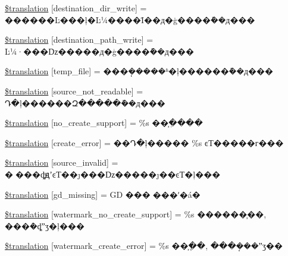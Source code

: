\begin{DoxyCompactItemize}
\hyperlink{class_8upload_8zh___c_n_8gb-2312_8php_a97608ea194a616db49141a0e6dee900c}{\$translation} \mbox{[}\textquotesingle{}destination\+\_\+dir\+\_\+write\textquotesingle{}\mbox{]} = \textquotesingle{}������Ŀ���ļ�Ŀ¼����Ϊ��д�ģ����ܽ��д���\textquotesingle{}
\item 
\hyperlink{class_8upload_8zh___c_n_8gb-2312_8php_a40e4e1962226b89fd76da5819a9602b0}{\$translation} \mbox{[}\textquotesingle{}destination\+\_\+path\+\_\+write\textquotesingle{}\mbox{]} = \textquotesingle{}Ŀ¼·���ǲ�����д�ģ����ܽ��д���\textquotesingle{}
\item 
\hyperlink{class_8upload_8zh___c_n_8gb-2312_8php_a2baece8da11e20d45175db91851ec3e3}{\$translation} \mbox{[}\textquotesingle{}temp\+\_\+file\textquotesingle{}\mbox{]} = \textquotesingle{}���ܴ�����ʱ�ļ������ܽ��д���\textquotesingle{}
\item 
\hyperlink{class_8upload_8zh___c_n_8gb-2312_8php_a922967ca2df0efdd455261142d8e5715}{\$translation} \mbox{[}\textquotesingle{}source\+\_\+not\+\_\+readable\textquotesingle{}\mbox{]} = \textquotesingle{}Դ�ļ������Զ�����ܽ��д���\textquotesingle{}
\item 
\hyperlink{class_8upload_8zh___c_n_8gb-2312_8php_a346dfd1ade29f583dd20d345c436859f}{\$translation} \mbox{[}\textquotesingle{}no\+\_\+create\+\_\+support\textquotesingle{}\mbox{]} = \textquotesingle{}\%s ��֧�ִ���\textquotesingle{}
\item 
\hyperlink{class_8upload_8zh___c_n_8gb-2312_8php_a53013ce9255c4e1849098ddd9fdb2b3f}{\$translation} \mbox{[}\textquotesingle{}create\+\_\+error\textquotesingle{}\mbox{]} = \textquotesingle{}��Դ�ļ����� \%s ͼƬ�����г���\textquotesingle{}
\item 
\hyperlink{class_8upload_8zh___c_n_8gb-2312_8php_a6ab0a660b457eaf2d3434b225449fdd6}{\$translation} \mbox{[}\textquotesingle{}source\+\_\+invalid\textquotesingle{}\mbox{]} = \textquotesingle{}�޷���ȡԭʼͼƬ��ȷ���ǲ�����ȷ��ͼƬ�ļ���\textquotesingle{}
\item 
\hyperlink{class_8upload_8zh___c_n_8gb-2312_8php_a7f3dfcc0db4bbc0f2e7210c439798e56}{\$translation} \mbox{[}\textquotesingle{}gd\+\_\+missing\textquotesingle{}\mbox{]} = \textquotesingle{}G\+D ���񲻿���ʹ�á�\textquotesingle{}
\item 
\hyperlink{class_8upload_8zh___c_n_8gb-2312_8php_a82d5853430ab72dc1f9799ec36144cc6}{\$translation} \mbox{[}\textquotesingle{}watermark\+\_\+no\+\_\+create\+\_\+support\textquotesingle{}\mbox{]} = \textquotesingle{}\%s ������֧��, ���ܶ�ȡˮӡ�ļ���\textquotesingle{}
\item 
\hyperlink{class_8upload_8zh___c_n_8gb-2312_8php_aabca0b65dadbc6184415c16375f284ca}{\$translation} \mbox{[}\textquotesingle{}watermark\+\_\+create\+\_\+error\textquotesingle{}\mbox{]} = \textquotesingle{}\%s ��֧�ֶ�, ���ܴ���ˮӡ��\textquotesingle{}

\end{DoxyCompactItemize}
